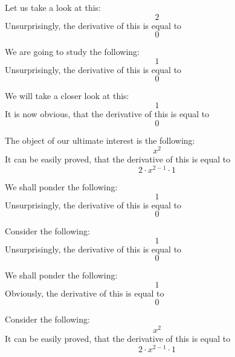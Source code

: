 \documentclass{article}
\begin{document}
Let us take a look at this:
\begin{equation}
2 
\end{equation}
Unsurprisingly, the derivative of this is equal to
\begin{equation}
0 
\end{equation}

We are going to study the following:
\begin{equation}
1 
\end{equation}
Unsurprisingly, the derivative of this is equal to
\begin{equation}
0 
\end{equation}

We will take a closer look at this:
\begin{equation}
1 
\end{equation}
It is now obvious, that the derivative of this is equal to
\begin{equation}
0 
\end{equation}

The object of our ultimate interest is the following:
\begin{equation}
x ^{2 } 
\end{equation}
It can be easily proved, that the derivative of this is equal to
\begin{equation}
2 \cdot x ^{2 - 1 } \cdot 1 
\end{equation}

We shall ponder the following:
\begin{equation}
1 
\end{equation}
Unsurprisingly, the derivative of this is equal to
\begin{equation}
0 
\end{equation}

Consider the following:
\begin{equation}
1 
\end{equation}
Unsurprisingly, the derivative of this is equal to
\begin{equation}
0 
\end{equation}

We shall ponder the following:
\begin{equation}
1 
\end{equation}
Obviously, the derivative of this is equal to
\begin{equation}
0 
\end{equation}

Consider the following:
\begin{equation}
x ^{2 } 
\end{equation}
It can be easily proved, that the derivative of this is equal to
\begin{equation}
2 \cdot x ^{2 - 1 } \cdot 1 
\end{equation}
\end{document}

